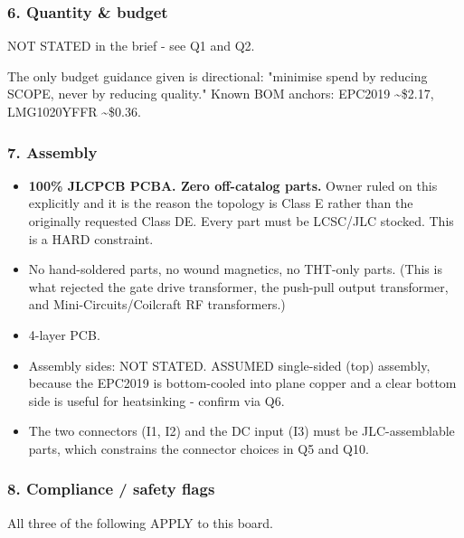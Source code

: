 \documentclass[11pt,a4paper]{article}
\begin{document}
\subsubsection*{6. Quantity \& budget}
NOT STATED in the brief - see Q1 and Q2.

The only budget guidance given is directional: "minimise spend by reducing SCOPE, never by reducing quality." Known BOM anchors: EPC2019 \textasciitilde{}\$2.17, LMG1020YFFR \textasciitilde{}\$0.36.

\subsubsection*{7. Assembly}
\begin{itemize}
\item \textbf{100\% JLCPCB PCBA. Zero off-catalog parts.} Owner ruled on this explicitly and it is the
reason the topology is Class E rather than the originally requested Class DE. Every part must be
LCSC/JLC stocked. This is a HARD constraint.
\item No hand-soldered parts, no wound magnetics, no THT-only parts. (This is what rejected the gate
drive transformer, the push-pull output transformer, and Mini-Circuits/Coilcraft RF transformers.)
\item 4-layer PCB.
\item Assembly sides: NOT STATED. ASSUMED single-sided (top) assembly, because the EPC2019 is
bottom-cooled into plane copper and a clear bottom side is useful for heatsinking - confirm
via Q6.
\item The two connectors (I1, I2) and the DC input (I3) must be JLC-assemblable parts, which
constrains the connector choices in Q5 and Q10.
\end{itemize}
\subsubsection*{8. Compliance / safety flags}
All three of the following APPLY to this board.
\end{document}
